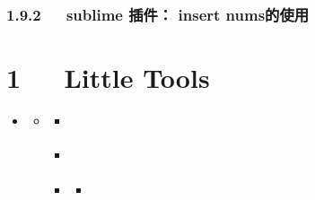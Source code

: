 \documentclass[letterpaper,12pt,english]{sphinxmanual}
\begin{document}
\subsection{1.9.2   sublime 插件： insert nums的使用}
\label{\detokenize{001software/001install/sublime:sublime-insert-nums}}

\chapter{1   Little Tools}
\label{\detokenize{001software/001install/tools:little-tools}}\label{\detokenize{001software/001install/tools::doc}}
\begin{sphinxShadowBox}
\begin{itemize}
\item {} 
\label{\detokenize{001software/001install/tools:id4}}{\hyperref[\detokenize{001software/001install/tools:little-tools}]{}}
\begin{itemize}
\item {} 
\label{\detokenize{001software/001install/tools:id5}}{\hyperref[\detokenize{001software/001install/tools:iconv}]{}}
\begin{itemize}
\item {} 
\label{\detokenize{001software/001install/tools:id6}}{\hyperref[\detokenize{001software/001install/tools:id1}]{}}

\item {} 
\label{\detokenize{001software/001install/tools:id7}}{\hyperref[\detokenize{001software/001install/tools:id2}]{}}

\item {} 
\label{\detokenize{001software/001install/tools:id8}}{\hyperref[\detokenize{001software/001install/tools:id3}]{}}
\begin{itemize}
\item {} 
\label{\detokenize{001software/001install/tools:id9}}{\hyperref[\detokenize{001software/001install/tools:iconv-illegal-input-sequence-at-position}]{}}

\end{itemize}

\end{itemize}

\end{itemize}

\end{itemize}
\end{sphinxShadowBox}
\end{document}
